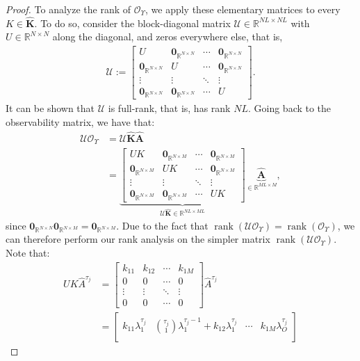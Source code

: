 \documentclass[letterpaper,12pt,peerreviewca,draftcls]{IEEEtran}
\newcommand{\la}{\lambda}
\newcommand{\R}{\mathbb{R}}
\newcommand{\kernel}{k}
\newcommand{\empK}{\ensuremath{K}}
\newcommand{\nsamp}{N}
\newcommand{\ncent}{M}
\DeclareMathOperator{\Rank}{rank}
\newcommand{\Obs}{\mathcal{O}}
\newcommand{\otime}{L}
\newcommand{\JorMul}{O}
\newcommand{\Tset}{\Upsilon}
\newcommand{\dualop}{A}
\newcommand{\dualopApprox}{\widehat{\dualop}}
\newcommand{\tindex}{\tau}
\newcommand{\catempK}{\widehat{\mathbf{K}}}
\newcommand{\catdualopC}{\widehat{\mathbf{A}}}
\newcommand{\zerosMat}[2]{\mathbf{0}_{\R^{#1\times#2}}}
\newcommand{\zerosK}{\zerosMat{\nsamp}{\ncent}}
\newcommand{\zerosU}{\zerosMat{\nsamp}{\nsamp}}
\newcommand{\bdU}{\mathcal{U}}
\begin{document}
\begin{proof}
	To analyze the rank of $\Obs_{\Tset}$, we apply these elementary matrices to every $\empK\in\catempK$. To do so, consider the block-diagonal matrix $\bdU\in\R^{\nsamp\otime\times\nsamp\otime}$ with $U\in\R^{\nsamp\times\nsamp}$ along the diagonal, and zeros everywhere else,
	that is,
	\begin{align}
	\bdU:= \begin{bmatrix}
	U   & \zerosU & \cdots & \zerosU\\
	\zerosU & U   & \cdots & \zerosU\\
	\vdots  & \vdots  & \ddots & \vdots\\
	\zerosU & \zerosU & \cdots & U
	\end{bmatrix}.
	\end{align}
	It can be shown that  $\bdU$ is full-rank, that is, has rank $\nsamp\otime$. Going back to the observability matrix, we have that:
	\begin{align*}
	\bdU\Obs_{\Tset} &= \bdU\catempK\catdualopC\\
	&=  
	\underbrace{
		\begin{bmatrix}
		U\empK   & \zerosK & \cdots & \zerosK\\
		\zerosK & U\empK   & \cdots & \zerosK\\
		\vdots  & \vdots  & \ddots & \vdots\\
		\zerosK & \zerosK & \cdots & U\empK
		\end{bmatrix}}_{\bdU\catempK\in\R^{\nsamp\otime\times\ncent\otime}}
	\underbrace{\catdualopC}_{\in\R^{\ncent\otime\times\ncent}},
	\end{align*}
	since $\zerosU\zerosK = \zerosK$. Due to the fact that $\Rank(\bdU\Obs_{\Tset}) = \Rank(\Obs_{\Tset})$,
	we can therefore perform our rank analysis on the simpler matrix $\Rank(\bdU\Obs_{\Tset})$. Note that:
	\begin{align*}
	U\empK \dualopApprox^{\tindex_j} &=  
	\begin{bmatrix}
	\kernel_{11} & \kernel_{12} & \cdots & \kernel_{1\ncent}\\
	0 & 0 & \cdots & 0\\
	\vdots & \vdots & \ddots & \vdots\\
	0 & 0 & \cdots & 0
	\end{bmatrix}
	\dualopApprox^{\tindex_j}\\
	&= 
	\begin{bmatrix}
	k_{11}\la_1^{\tindex_j} & \binom{\tindex_j}{1}\la_1^{\tindex_j-1} + k_{12}\la_1^{\tindex_j}  & \cdots & k_{1\ncent}\la_{\JorMul}^{\tindex_j}\\

\end{bmatrix}
\end{align*}
\end{proof}
\end{document}
